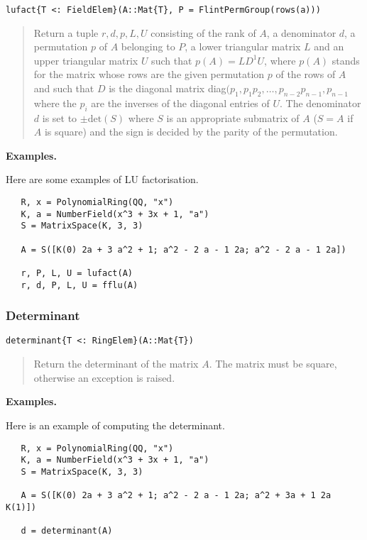 \documentclass[a4paper,10pt]{article}
\newcommand{\desc}[1]{\vspace{-3mm}\begin{quote}#1\end{quote}}
\begin{document}
\begin{lstlisting}
lufact{T <: FieldElem}(A::Mat{T}, P = FlintPermGroup(rows(a)))
\end{lstlisting}

\desc{Return a tuple $r, d, p, L, U$ consisting of the rank of $A$, a
denominator $d$, a permutation $p$ of $A$ belonging to $P$, a lower triangular
matrix $L$ and an upper triangular matrix $U$ such that $p(A) = LD^1U$, where
$p(A)$ stands for the matrix whose rows are the given permutation $p$ of the
rows of $A$ and such that $D$ is the diagonal matrix
diag$(p_1, p_1p_2, \ldots, p_{n-2}p_{n-1}, p_{n-1}$ where the $p_i$ are the
inverses of the diagonal entries of $U$. The denominator $d$ is set to
$\pm \mbox{det}(S)$ where $S$ is an appropriate submatrix of $A$ ($S = A$ if
$A$ is square) and the sign is decided by the parity of the permutation.}

\textbf{Examples.}

Here are some examples of LU factorisation.

\begin{lstlisting}
   R, x = PolynomialRing(QQ, "x")
   K, a = NumberField(x^3 + 3x + 1, "a")
   S = MatrixSpace(K, 3, 3)
   
   A = S([K(0) 2a + 3 a^2 + 1; a^2 - 2 a - 1 2a; a^2 - 2 a - 1 2a])

   r, P, L, U = lufact(A)
   r, d, P, L, U = fflu(A)
\end{lstlisting}

\subsubsection{Determinant}

\begin{lstlisting}
determinant{T <: RingElem}(A::Mat{T})
\end{lstlisting}

\desc{Return the determinant of the matrix $A$. The matrix must be square,
otherwise an exception is raised.}

\textbf{Examples.}

Here is an example of computing the determinant.

\begin{lstlisting}
   R, x = PolynomialRing(QQ, "x")
   K, a = NumberField(x^3 + 3x + 1, "a")
   S = MatrixSpace(K, 3, 3)
   
   A = S([K(0) 2a + 3 a^2 + 1; a^2 - 2 a - 1 2a; a^2 + 3a + 1 2a K(1)])

   d = determinant(A)
\end{lstlisting}
\end{document}
